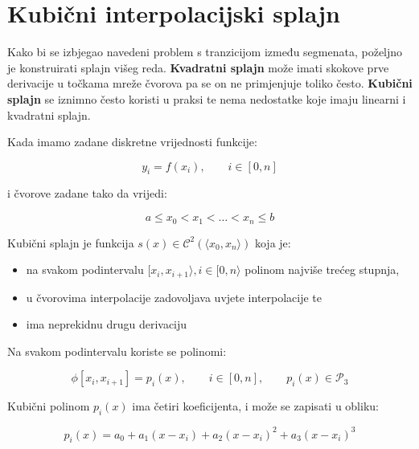 
\section{Kubični interpolacijski splajn}

Kako bi se izbjegao navedeni problem s tranzicijom između segmenata, poželjno je konstruirati splajn višeg reda.
\textbf{Kvadratni splajn} može imati skokove prve derivacije u točkama mreže čvorova pa se on ne primjenjuje toliko često.
\textbf{Kubični splajn} se iznimno često koristi u praksi te nema nedostatke koje imaju linearni i kvadratni splajn.

Kada imamo zadane diskretne vrijednosti funkcije:

\begin{equation*}
y_i=f(x_i),\qquad i\in[0,n]
\end{equation*}

i čvorove zadane tako da vrijedi:

$$
a\leq x_0 < x_1 < \dots < x_n \leq b
$$

Kubični splajn je funkcija $s(x)\in\mathcal{C}^2(\langle x_0,x_n\rangle)$ koja je:

\begin{itemize}
    \item na svakom podintervalu $[x_i, x_{i+1}\rangle, i\in[0,n\rangle$ polinom najviše trećeg stupnja,
    \item u čvorovima interpolacije zadovoljava uvjete interpolacije te
    \item ima neprekidnu drugu derivaciju
\end{itemize}

Na svakom podintervalu koriste se polinomi:

\begin{equation*}
\phi[x_i,x_{i+1}] = p_i(x),\qquad i\in[0,n],\qquad p_i(x)\in\mathcal{P}_3
\end{equation*}

Kubični polinom $p_i(x)$ ima četiri koeficijenta, i može se zapisati u obliku:

$$
p_i(x)=a_0+a_1(x-x_i)+a_2(x-x_i)^2+a_3(x-x_i)^3
$$


